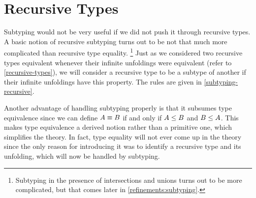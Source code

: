 
\section{Recursive Types}
\label{subtyping-recursive-types}

Subtyping would not be very useful if we did not push it through recursive types. A basic notion of recursive subtyping turns out to be not that much more complicated than recursive type equality.%
\footnote{Subtyping in the presence of intersections and unions turns out to be more complicated, but that comes later in \cref{refinements:subtyping}.} Just as we considered two recursive types equivalent whenever their infinite unfoldings were equivalent (refer to \cref{recursive-types}), we will consider a recursive type to be a subtype of another if their infinite unfoldings have this property. The rules are given in \cref{subtyping-recursive}.


Another advantage of handling subtyping properly is that it subsumes type equivalence since we can define $A \equiv B$ if and only if $A \le B$ and $B \le A$. This makes type equivalence a derived notion rather than a primitive one, which simplifies the theory. In fact, type equality will not ever come up in the theory since the only reason for introducing it was to identify a recursive type and its unfolding, which will now be handled by subtyping.

